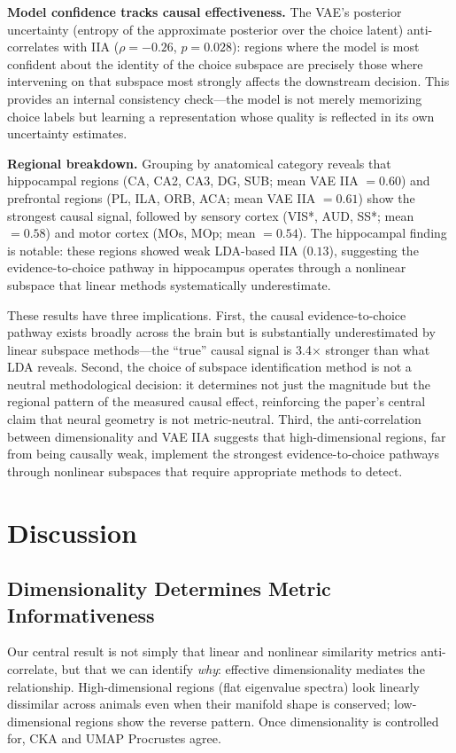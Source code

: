 \documentclass{article}
\begin{document}
\textbf{Model confidence tracks causal effectiveness.} The VAE's posterior uncertainty (entropy of the approximate posterior over the choice latent) anti-correlates with IIA ($\rho = -0.26$, $p = 0.028$): regions where the model is most confident about the identity of the choice subspace are precisely those where intervening on that subspace most strongly affects the downstream decision. This provides an internal consistency check---the model is not merely memorizing choice labels but learning a representation whose quality is reflected in its own uncertainty estimates.

\textbf{Regional breakdown.} Grouping by anatomical category reveals that hippocampal regions (CA, CA2, CA3, DG, SUB; mean VAE IIA $= 0.60$) and prefrontal regions (PL, ILA, ORB, ACA; mean VAE IIA $= 0.61$) show the strongest causal signal, followed by sensory cortex (VIS*, AUD, SS*; mean $= 0.58$) and motor cortex (MOs, MOp; mean $= 0.54$). The hippocampal finding is notable: these regions showed weak LDA-based IIA ($0.13$), suggesting the evidence-to-choice pathway in hippocampus operates through a nonlinear subspace that linear methods systematically underestimate.

These results have three implications. First, the causal evidence-to-choice pathway exists broadly across the brain but is substantially underestimated by linear subspace methods---the ``true'' causal signal is 3.4$\times$ stronger than what LDA reveals. Second, the choice of subspace identification method is not a neutral methodological decision: it determines not just the magnitude but the regional pattern of the measured causal effect, reinforcing the paper's central claim that neural geometry is not metric-neutral. Third, the anti-correlation between dimensionality and VAE IIA suggests that high-dimensional regions, far from being causally weak, implement the strongest evidence-to-choice pathways through nonlinear subspaces that require appropriate methods to detect.

\section{Discussion}

\subsection{Dimensionality Determines Metric Informativeness}

Our central result is not simply that linear and nonlinear similarity metrics anti-correlate, but that we can identify \emph{why}: effective dimensionality mediates the relationship. High-dimensional regions (flat eigenvalue spectra) look linearly dissimilar across animals even when their manifold shape is conserved; low-dimensional regions show the reverse pattern. Once dimensionality is controlled for, CKA and UMAP Procrustes agree.
\end{document}
